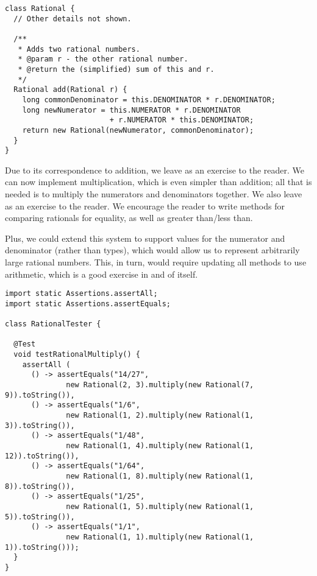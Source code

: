 \begin{lstlisting}[language=MyJava]
class Rational {
  // Other details not shown.

  /**
   * Adds two rational numbers.
   * @param r - the other rational number.
   * @return the (simplified) sum of this and r.
   */
  Rational add(Rational r) {
    long commonDenominator = this.DENOMINATOR * r.DENOMINATOR;
    long newNumerator = this.NUMERATOR * r.DENOMINATOR 
                        + r.NUMERATOR * this.DENOMINATOR;
    return new Rational(newNumerator, commonDenominator);
  }
}
\end{lstlisting}

Due to its correspondence to addition, we leave  as an exercise to the reader. 
We can now implement multiplication, which is even simpler than addition; all that is needed is to multiply the numerators and denominators together. 
We also leave  as an exercise to the reader. 
We encourage the reader to write methods for comparing rationals for equality, as well as greater than/less than. 

Plus, we could extend this system to support  values for the numerator and denominator (rather than  types), which would allow us to represent arbitrarily large rational numbers. 
This, in turn, would require updating all methods to use  arithmetic, which is a good exercise in and of itself.

\enlargethispage{-6\baselineskip}
\begin{lstlisting}[language=MyJava]
import static Assertions.assertAll;
import static Assertions.assertEquals;

class RationalTester {

  @Test
  void testRationalMultiply() {
    assertAll (
      () -> assertEquals("14/27", 
              new Rational(2, 3).multiply(new Rational(7, 9)).toString()),
      () -> assertEquals("1/6", 
              new Rational(1, 2).multiply(new Rational(1, 3)).toString()),
      () -> assertEquals("1/48", 
              new Rational(1, 4).multiply(new Rational(1, 12)).toString()),
      () -> assertEquals("1/64", 
              new Rational(1, 8).multiply(new Rational(1, 8)).toString()),
      () -> assertEquals("1/25", 
              new Rational(1, 5).multiply(new Rational(1, 5)).toString()),
      () -> assertEquals("1/1", 
              new Rational(1, 1).multiply(new Rational(1, 1)).toString()));
  }
}
\end{lstlisting}

